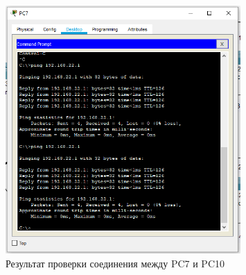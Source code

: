 \begin{figure}[H]
    \centering
    \includegraphics[width=0.8\textwidth]{img/content/ping_2.png}
    \caption{Результат проверки соединения между PC7 и PC10}
    \label{fig:ping_2}
\end{figure}
